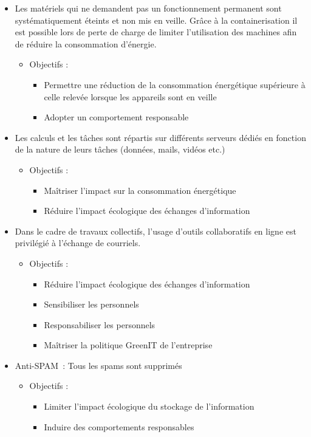 \begin{itemize}
\item
  Les matériels qui ne demandent pas un fonctionnement permanent sont
  systématiquement éteints et non mis en veille. Grâce à la
  containerisation il est possible lors de perte de charge de limiter
  l'utilisation des machines afin de réduire la consommation d'énergie.

  \begin{itemize}
  \item
    Objectifs :

    \begin{itemize}
    \item
      Permettre une réduction de la consommation énergétique supérieure
      à celle relevée lorsque les appareils sont en veille
    \item
      Adopter un comportement responsable
    \end{itemize}
  \end{itemize}
\item
  Les calculs et les tâches sont répartis sur différents serveurs dédiés
  en fonction de la nature de leurs tâches (données, mails, vidéos etc.)

  \begin{itemize}
  \item
    Objectifs :

    \begin{itemize}
    \item
      Maîtriser l'impact sur la consommation énergétique
    \item
      Réduire l'impact écologique des échanges d'information
    \end{itemize}
  \end{itemize}
\item
  Dans le cadre de travaux collectifs, l'usage d'outils collaboratifs en
  ligne est privilégié à l'échange de courriels.

  \begin{itemize}
  \item
    Objectifs :

    \begin{itemize}
    \item
      Réduire l'impact écologique des échanges d'information
    \item
      Sensibiliser les personnels
    \item
      Responsabiliser les personnels
    \item
      Maîtriser la politique GreenIT de l'entreprise
    \end{itemize}
  \end{itemize}
\item
  Anti-SPAM~: Tous les spams sont supprimés

  \begin{itemize}
  \item
    Objectifs :

    \begin{itemize}
    \item
      Limiter l'impact écologique du stockage de l'information
    \item
      Induire des comportements responsables
    \end{itemize}
  \end{itemize}
\end{itemize}
